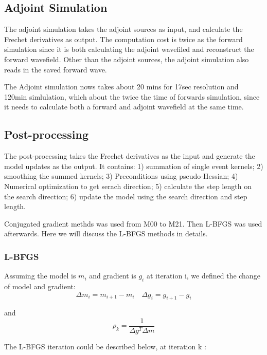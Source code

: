 \documentclass[extra,mreferee]{gji}
\begin{document}
\subsection{Adjoint Simulation}
The adjoint simulation takes the adjoint sources as input, and calculate the Frechet derivatives as output. The computation cost is twice as the forward simulation since it is both calculating the adjoint wavefiled and reconstruct the forward wavefield. Other than the adjoint sources, the adjoint simulation also reads in the saved forward wave. 

The Adjoint simulation nows takes about 20 mins for 17sec resolution and 120min simlulation, which about the twice the time of forwards simulation, since it needs to calculate both a forward and adjoint wavefield at the same time.

\subsection{Post-processing}
The post-processing takes the Frechet derivatives as the input and generate the model updates as the output. It contains: 1) summation of single event kernels; 2) smoothing the summed kernels; 3) Preconditions using pseudo-Hessian; 4) Numerical optimization to get serach direction; 5) calculate the step length on the search direction; 6) update the model using the search direction and step length.

Conjugated gradient methds was used from M00 to M21. Then L-BFGS was used afterwards. Here we will discuss the L-BFGS methods in details.

\subsubsection{L-BFGS}

Assuming the model is $m_i$ and gradient is $g_i$ at iteration i, we defined the change of model and gradient:\\
\begin{equation*}
    \Delta m_i = m_{i+1} - m_i \quad
    \Delta g_i = g_{i+1} - g_i
\end{equation*}

and \\
\begin{equation*}
     \rho_k = \frac{1}{\Delta g^{T} \Delta m}
\end{equation*}

The L-BFGS iteration could be described below, at iteration k \cite{NumericalOptimization}:
\end{document}
